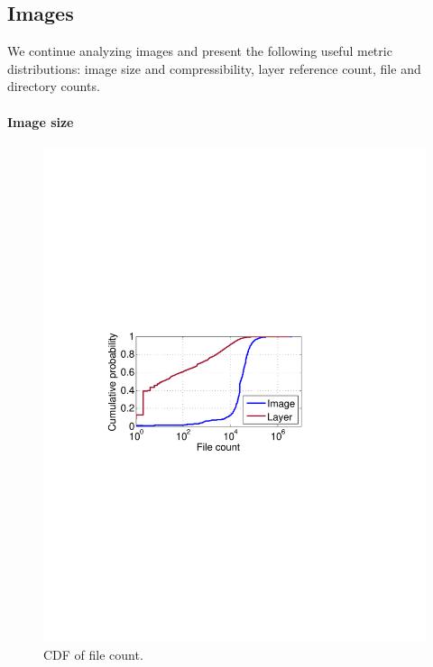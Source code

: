 \subsection{Images}
\label{sec:images}

We continue analyzing images and present the following useful metric distributions: image size and compressibility, layer reference count, file and directory
counts. 

\paragraph{Image size}%

\begin{figure}[t]
	\centering
	\begin{minipage}{0.22\textwidth}
		\centering
		\includegraphics[width=1\textwidth]{graphs/file-cnt-cdf.pdf}
		\caption{CDF of file count.}
		\label{fig:file-cnt-cdf}
	\end{minipage}
	\begin{minipage}{0.22\textwidth}

\end{minipage}
\end{figure}
